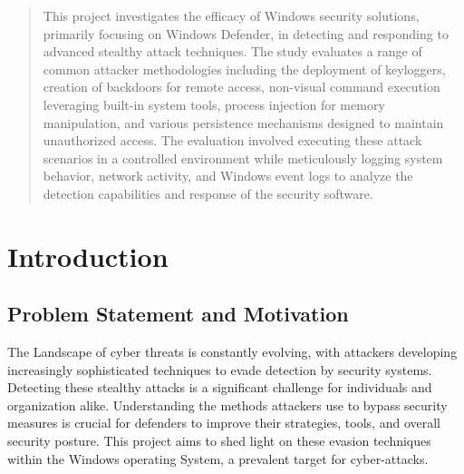 \documentclass[11pt]{article}
\begin{document}
		\justifying
		
		\tableofcontents
		\newpage
		\listoffigures
		\newpage
		
		\begin{abstract}
		This project investigates the efficacy of Windows security solutions, primarily focusing on Windows Defender, in detecting and responding to advanced stealthy attack techniques. The study evaluates a range of common attacker methodologies including the deployment of keyloggers, creation of backdoors for remote access, non-visual command execution leveraging built-in system tools, process injection for memory manipulation, and various persistence mechanisms designed to maintain unauthorized access. The evaluation involved executing these attack scenarios in a controlled environment while meticulously logging system behavior, network activity, and Windows event logs to analyze the detection capabilities and response of the security software.
		\end{abstract}
		
		\newpage
		\section{Introduction}
		\subsection{Problem Statement and Motivation}
		The Landscape of cyber threats is constantly evolving, with attackers developing increasingly sophisticated techniques to evade detection by security systems. Detecting these stealthy attacks is a significant challenge for individuals and organization alike. Understanding the methods attackers use to bypass security measures is crucial for defenders to improve their strategies, tools, and overall security posture. This project aims to shed light on these evasion techniques within the Windows operating System, a prevalent target for cyber-attacks.
\end{document}
